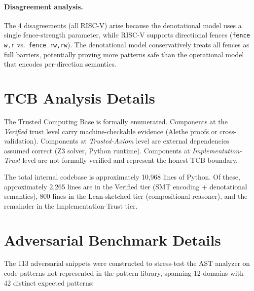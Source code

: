 \documentclass[11pt]{article}
\begin{document}
\paragraph{Disagreement analysis.}
The 4 disagreements (all RISC-V) arise because the denotational model
uses a single fence-strength parameter, while RISC-V supports
directional fences (\texttt{fence w,r} vs.\ \texttt{fence rw,rw}).
The denotational model conservatively treats all fences as full
barriers, potentially proving more patterns safe than the operational
model that encodes per-direction semantics.

\section{TCB Analysis Details}
\label{app:tcb-details}

The Trusted Computing Base is formally enumerated.  Components at
the \emph{Verified} trust level carry machine-checkable evidence
(Alethe proofs or cross-validation).  Components at
\emph{Trusted-Axiom} level are external dependencies assumed correct
(Z3 solver, Python runtime).  Components at
\emph{Implementation-Trust} level are not formally verified and
represent the honest TCB boundary.

The total internal codebase is approximately 10{,}968 lines of Python.
Of these, approximately 2{,}265 lines are in the Verified tier
(SMT encoding + denotational semantics), 800 lines in the
Lean-sketched tier (compositional reasoner), and the remainder
in the Implementation-Trust tier.

\section{Adversarial Benchmark Details}
\label{app:adversarial-details}

The 113 adversarial snippets were constructed to stress-test the
AST analyzer on code patterns not represented in the pattern library,
spanning 12 domains with 42 distinct expected patterns:
\end{document}
